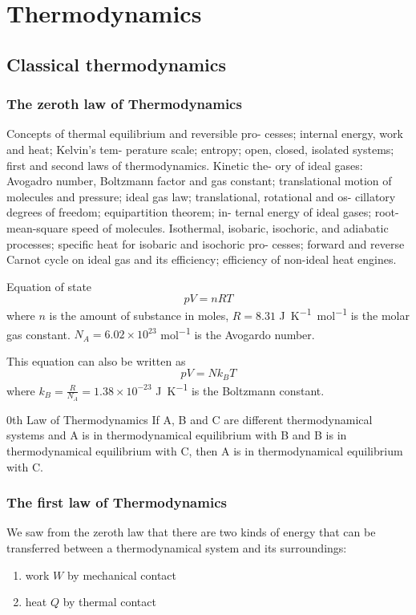 \part{Thermodynamics}
\chapter{Classical thermodynamics}
\section{The zeroth law of Thermodynamics}
Concepts of thermal equilibrium and reversible pro-
cesses; internal energy, work and heat; Kelvin’s tem-
perature scale; entropy; open, closed, isolated systems;
first and second laws of thermodynamics. Kinetic the-
ory of ideal gases: Avogadro number, Boltzmann factor
and gas constant; translational motion of molecules and
pressure; ideal gas law; translational, rotational and os-
cillatory degrees of freedom; equipartition theorem; in-
ternal energy of ideal gases; root-mean-square speed of
molecules. Isothermal, isobaric, isochoric, and adiabatic
processes; specific heat for isobaric and isochoric pro-
cesses; forward and reverse Carnot cycle on ideal gas and
its efficiency; efficiency of non-ideal heat engines.

Equation of state
\begin{equation}
pV = nRT
\end{equation}
where $n$ is the amount of substance in moles, $R = 8.31$ \unit{J.K^{-1}.mol^{-1}} is the molar gas constant. $N_A = 6.02 \times 10^{23}$ \unit{mol^{-1}} is the Avogardo number.

This equation can also be written as
\[ pV = Nk_BT \]
where $k_B = \frac{R}{N_A} = 1.38 \times 10^{-23}$ \unit{J.K^{-1}} is the Boltzmann constant.

\begin{thrm}{0th Law of Thermodynamics}{}
If A, B and C are different thermodynamical systems and A is in thermodynamical equilibrium with B and B is in thermodynamical equilibrium with C, then A is in thermodynamical equilibrium with C.
\end{thrm}

\section{The first law of Thermodynamics}
We saw from the zeroth law that there are two kinds of energy that can be transferred between a thermodynamical system and its surroundings:
\begin{enumerate}
\item work $W$ by mechanical contact
\item heat $Q$ by thermal contact
\end{enumerate}

